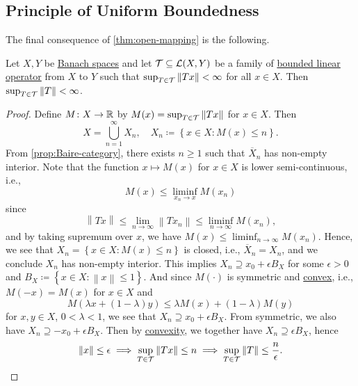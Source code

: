 \subsection{Principle of Uniform Boundedness}
The final consequence of \autoref{thm:open-mapping} is the following.
\begin{proposition}\label{prop:uniform-boundedness}
	Let \(X, Y\) be \hyperref[def:Banach-space]{Banach spaces} and let \(\mathcal{\MakeUppercase{T}} \subseteq \mathcal{\MakeUppercase{l}} (X, Y)\) be a family of \hyperref[def:bounded-linear-op]{bounded linear operator} from \(X\) to \(Y\) such that \(\sup _{T\in \mathcal{\MakeUppercase{t}} } \left\lVert Tx\right\rVert < \infty\) for all \(x\in X\). Then \(\sup _{T\in \mathcal{\MakeUppercase{t}} }\left\lVert T\right\rVert < \infty \).
\end{proposition}
\begin{proof}
	Define \(M\colon X\to \mathbb{\MakeUppercase{r}} \) by \(M(x) = \sup _{T\in \mathcal{\MakeUppercase{t}} }\left\lVert Tx\right\rVert \) for \(x\in X\). Then
	\[
		X = \bigcup\limits_{n=1}^{\infty} X_n,\quad X_n \coloneqq \left\{ x\in X\colon M(x) \leq n \right\}.
	\]
	From \autoref{prop:Baire-category}, there exists \(n \geq 1\) such that \(\overline{X} _n\) has non-empty interior. Note that the function \(x \mapsto M(x)\) for \(x\in X\) is lower semi-continuous, i.e.,
	\[
		M(x) \leq \liminf_{x_n \to x} M(x_n)
	\]
	since
	\[
		\left\lVert Tx\right\rVert \leq \lim\limits_{n \to \infty} \left\lVert Tx_n\right\rVert \leq \liminf_{n \to \infty} M(x_n),
	\]
	and by taking supremum over \(x\), we have \(M(x) \leq \liminf_{n \to \infty} M(x_n)\). Hence, we see that \(X_n = \left\{ x\in X\colon M(x)\leq n \right\} \) is closed, i.e., \(\overline{X} _n = X_n\), and we conclude \(X_n\) has non-empty interior. This implies \(X_n \supseteq x_{0} + \epsilon B_X\) for some \(\epsilon > 0\) and \(B_X\coloneqq \left\{ x\in X\colon \left\lVert x\right\rVert \leq 1 \right\} \). And since \(M(\cdot)\) is symmetric and \hyperref[def:convex-function]{convex}, i.e., \(M(-x) = M(x)\) for \(x\in X\) and
	\[
		M(\lambda x + (1 - \lambda )y) \leq \lambda M(x) + (1 - \lambda )M(y)
	\]
	for \(x, y\in X\), \(0 < \lambda < 1\), we see that \(X_n \supseteq x_0 + \epsilon B_X\). From symmetric, we also have \(X_n \supseteq -x_0 + \epsilon B_X\). Then by \hyperref[def:convex-function]{convexity}, we together have \(X_n \supseteq \epsilon B_X\), hence
	\[
		\left\lVert x\right\rVert \leq \epsilon \implies \sup _{T\in \mathcal{\MakeUppercase{t}} } \left\lVert Tx\right\rVert \leq n\implies \sup _{T\in \mathcal{\MakeUppercase{t}} } \left\lVert T\right\rVert \leq \frac{n}{\epsilon }.
	\]
\end{proof}

